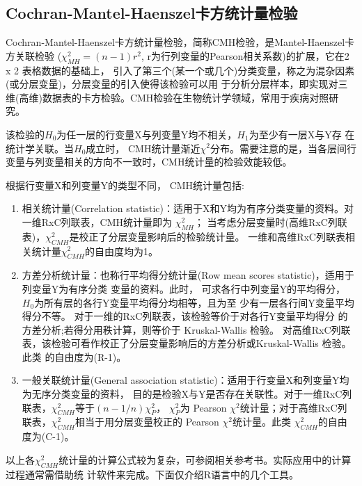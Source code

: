 \documentclass[
]{article}
\begin{document}
\hypertarget{cochran-mantel-haenszelux5361ux65b9ux7edfux8ba1ux91cfux68c0ux9a8c}{%
\subsection{Cochran-Mantel-Haenszel卡方统计量检验}\label{cochran-mantel-haenszelux5361ux65b9ux7edfux8ba1ux91cfux68c0ux9a8c}}

Cochran-Mantel-Haenszel卡方统计量检验，简称CMH检验，是Mantel-Haenszel卡方关联检验
(\(\chi_{MH}^2=(n-1)r^2\), r为行列变量的Pearson相关系数)的扩展，它在2 x 2 表格数据的基础上，
引入了第三个(某一个或几个)分类变量，称之为混杂因素(或分层变量)，分层变量的引入使得该检验可以用
于分析分层样本，即实现对三维(高维)数据表的卡方检验。CMH检验在生物统计学领域，常用于疾病对照研究。

该检验的\(H_0\)为任一层的行变量X与列变量Y均不相关，\(H_1\)为至少有一层X与Y存 在统计学关联。当\(H_0\)成立时，
CMH统计量渐近\(\chi^2\)分布。需要注意的是，当各层间行变量与列变量相关的方向不一致时，CMH统计量的检验效能较低。

根据行变量X和列变量Y的类型不同， CMH统计量包括:

\begin{enumerate}
\def\labelenumi{\arabic{enumi}.}
\item
  相关统计量(Correlation statistic)：适用于X和Y均为有序分类变量的资料。对一维RxC列联表，CMH统计量即为 \(\chi_{MH}^2\)；
  当考虑分层变量时(高维RxC列联表)，\(\chi_{CMH}^2\)是校正了分层变量影响后的检验统计量。
  一维和高维RxC列联表相关统计量\(\chi_{CMH}^2\)的自由度均为1。
\item
  方差分析统计量：也称行平均得分统计量(Row mean scores statistic)，适用于列变量Y为有序分类 变量的资料。此时，
  可求各行中列变量Y的平均得分，\(H_0\)为所有层的各行Y变量平均得分均相等，且为至 少有一层各行间Y变量平均得分不等。
  对于一维的RxC列联表，该检验等价于对各行Y变量平均得分 的方差分析;若得分用秩计算，则等价于 Kruskal-Wallis 检验。
  对高维RxC列联表，该检验可看作校正了分层变量影响后的方差分析或Kruskal-Wallis 检验。此类 的自由度为(R-1)。
\item
  一般关联统计量(General association statistic)：适用于行变量X和列变量Y均为无序分类变量的资料，
  目的是检验X与Y是否存在关联性。对于一维RxC列联表，\(\chi_{CMH}^2\)等于\((n-1/n)\chi_P^2\)，
  \(\chi_P^2\)为 Pearson \(\chi^2\)统计量；对于高维RxC列联表，\(\chi_{CMH}^2\)相当于用分层变量校正的
  Pearson \(\chi^2\)统计量。此类 \(\chi_{CMH}^2\)的自由度为(C-1)。
\end{enumerate}

以上各\(\chi_{CMH}^2\)统计量的计算公式较为复杂，可参阅相关参考书。实际应用中的计算过程通常需借助统
计软件来完成。下面仅介绍R语言中的几个工具。
\end{document}

